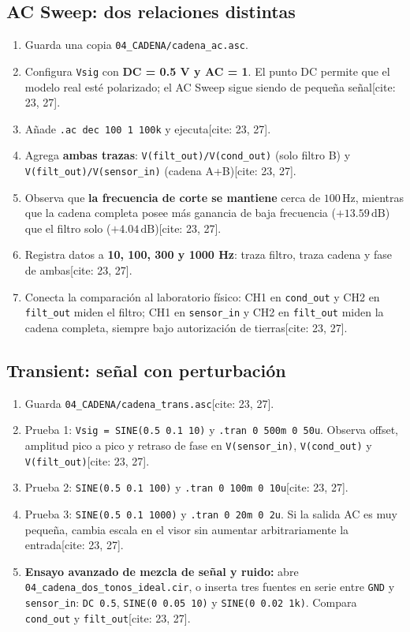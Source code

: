 \documentclass[10pt, a4paper]{article}
\begin{document}
\subsection{AC Sweep: dos relaciones distintas}
\begin{enumerate}[noitemsep, leftmargin=*]
    \item Guarda una copia \texttt{04\_CADENA/cadena\_ac.asc}.
    \item Configura \texttt{Vsig} con \textbf{DC = 0.5 V y AC = 1}. El punto DC permite que el modelo real esté polarizado; el AC Sweep sigue siendo de pequeña señal[cite: 23, 27].
    \item Añade \texttt{.ac dec 100 1 100k} y ejecuta[cite: 23, 27].
    \item Agrega \textbf{ambas trazas}: \texttt{V(filt\_out)/V(cond\_out)} (solo filtro B) y \texttt{V(filt\_out)/V(sensor\_in)} (cadena A+B)[cite: 23, 27].
    \item Observa que \textbf{la frecuencia de corte se mantiene} cerca de $100\,\text{Hz}$, mientras que la cadena completa posee más ganancia de baja frecuencia ($+13.59\,\text{dB}$) que el filtro solo ($+4.04\,\text{dB}$)[cite: 23, 27].
    \item Registra datos a \textbf{10, 100, 300 y 1000 Hz}: traza filtro, traza cadena y fase de ambas[cite: 23, 27].
    \item Conecta la comparación al laboratorio físico: CH1 en \texttt{cond\_out} y CH2 en \texttt{filt\_out} miden el filtro; CH1 en \texttt{sensor\_in} y CH2 en \texttt{filt\_out} miden la cadena completa, siempre bajo autorización de tierras[cite: 23, 27].
\end{enumerate}

\subsection{Transient: señal con perturbación}
\begin{enumerate}[noitemsep, leftmargin=*]
    \item Guarda \texttt{04\_CADENA/cadena\_trans.asc}[cite: 23, 27].
    \item Prueba 1: \texttt{Vsig = SINE(0.5 0.1 10)} y \texttt{.tran 0 500m 0 50u}. Observa offset, amplitud pico a pico y retraso de fase en \texttt{V(sensor\_in)}, \texttt{V(cond\_out)} y \texttt{V(filt\_out)}[cite: 23, 27].
    \item Prueba 2: \texttt{SINE(0.5 0.1 100)} y \texttt{.tran 0 100m 0 10u}[cite: 23, 27].
    \item Prueba 3: \texttt{SINE(0.5 0.1 1000)} y \texttt{.tran 0 20m 0 2u}. Si la salida AC es muy pequeña, cambia escala en el visor sin aumentar arbitrariamente la entrada[cite: 23, 27].
    \item \textbf{Ensayo avanzado de mezcla de señal y ruido:} abre \texttt{04\_cadena\_dos\_tonos\_ideal.cir}, o inserta tres fuentes en serie entre \texttt{GND} y \texttt{sensor\_in}: \texttt{DC 0.5}, \texttt{SINE(0 0.05 10)} y \texttt{SINE(0 0.02 1k)}. Compara \texttt{cond\_out} y \texttt{filt\_out}[cite: 23, 27].
\end{enumerate}
\end{document}
